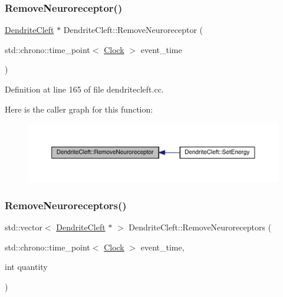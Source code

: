 \subsubsection{\texorpdfstring{Remove\+Neuroreceptor()}{RemoveNeuroreceptor()}}
{\footnotesize\ttfamily \hyperlink{class_dendrite_cleft}{Dendrite\+Cleft} $\ast$ Dendrite\+Cleft\+::\+Remove\+Neuroreceptor (\begin{DoxyParamCaption}\item[{std\+::chrono\+::time\+\_\+point$<$ \hyperlink{universe_8h_a0ef8d951d1ca5ab3cfaf7ab4c7a6fd80}{Clock} $>$}]{event\+\_\+time }\end{DoxyParamCaption})}



Definition at line 165 of file dendritecleft.\+cc.

Here is the caller graph for this function\+:
\nopagebreak
\begin{figure}[H]
\begin{center}
\leavevmode
\includegraphics[width=350pt]{class_dendrite_cleft_afaf06d4516355dfe2e0e4c33a00f0f1d_icgraph}
\end{center}
\end{figure}
\mbox{\label{class_dendrite_cleft_ac29b12d4abcc47fa298ab9e95f578f0e}} 
\subsubsection{\texorpdfstring{Remove\+Neuroreceptors()}{RemoveNeuroreceptors()}}
{\footnotesize\ttfamily std\+::vector$<$ \hyperlink{class_dendrite_cleft}{Dendrite\+Cleft} $\ast$ $>$ Dendrite\+Cleft\+::\+Remove\+Neuroreceptors (\begin{DoxyParamCaption}\item[{std\+::chrono\+::time\+\_\+point$<$ \hyperlink{universe_8h_a0ef8d951d1ca5ab3cfaf7ab4c7a6fd80}{Clock} $>$}]{event\+\_\+time,  }\item[{int}]{quantity }\end{DoxyParamCaption})}



